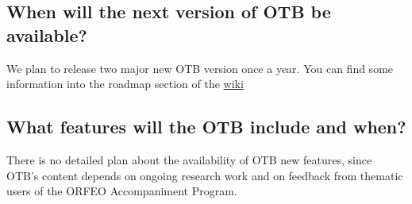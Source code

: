 \subsection{When will the next version of OTB be available?}
We plan to release two major new OTB version once a year. You can find some information into the roadmap section of the \href{http://wiki.orfeo-toolbox.org/index.php/Main_Page}{wiki} 

\subsection{What features will the OTB include and when?}
There is no detailed plan about the availability of OTB new features,
since OTB's content depends on ongoing research work and on feedback
from thematic users of the ORFEO Accompaniment Program.

